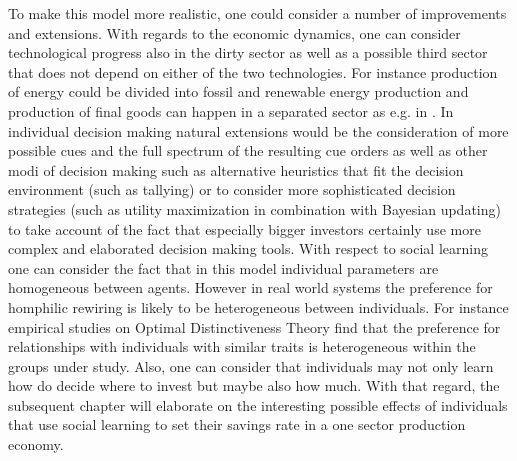 To make this model more realistic, one could consider a number of improvements and extensions. With regards to the economic dynamics, one can consider technological progress also in the dirty sector as well as a possible third sector that does not depend on either of the two technologies. For instance production of energy could be divided into fossil and renewable energy production and production of final goods can happen in a separated sector as e.g. in \cite{Heitzig2015a}. In individual decision making natural extensions would be the consideration of more possible cues and the full spectrum of the resulting cue orders as well as other modi of decision making such as alternative heuristics that fit the decision environment (such as tallying) or to consider more sophisticated decision strategies (such as utility maximization in combination with Bayesian updating) to take account of the fact that especially bigger investors certainly use more complex and elaborated decision making tools. With respect to social learning one can consider the fact that in this model individual parameters are homogeneous between agents. However in real world systems the preference for homphilic rewiring is likely to be heterogeneous between individuals. For instance empirical studies on Optimal Distinctiveness Theory \cite{hornsey1999subgroup, leonardelli2010optimal} find that the preference for relationships with individuals with similar traits is heterogeneous within the groups under study.
Also, one can consider that individuals may not only learn how do decide where to invest but maybe also how much. With that regard, the subsequent chapter will elaborate on the interesting possible effects of individuals that use social learning to set their savings rate in a one sector production economy.
